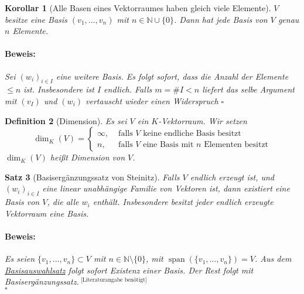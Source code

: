 \documentclass{report}
\newcommand{\IN}[1]{\index{#1|BH}}
\newcommand{\N}{\mathbb{N}}
\DeclareMathOperator{\Span}{span}
\theoremstyle{customrem}
\theoremstyle{customdef}
\newtheorem{definition}{Definition}[chapter]
\newtheorem{kor}[definition]{Korollar}
\newtheorem{satz}[definition]{Satz}
\renewenvironment{proof}{\vspace{-.75cm}\paragraph{Beweis: }}{\vspace{-.5cm}\hfill$\square$}
\begin{document}
	\begin{kor}[Alle Basen eines Vektorraumes haben gleich viele Elemente]
		$V$ besitze eine Basis $(v_1, \dots, v_n)$ mit $n \in \N \cup \{0\}$. Dann hat jede Basis von $V$ genau $n$ Elemente.\\
		
		\begin{proof}
			Sei $(w_i)_{i \in I}$ eine weitere Basis. Es folgt sofort, dass die Anzahl der Elemente $\le n$ ist. Insbesondere ist $I$ endlich. Falls $m = \#I < n$ liefert das selbe Argument mit $(v_I)$ und $(w_i)$ vertauscht wieder einen Widerspruch \Lightning
		\end{proof}
	\end{kor}
	\vspace{.25cm}
	\begin{definition}[Dimension]
		\IN{Vektorraum!Dimension}
		Es sei $V$ ein $K$-Vektorraum. Wir setzen
		$$\dim_K(V) = \begin{cases}\infty,&\text{ falls $V$ keine endliche Basis besitzt}\\n,&\text{ falls $V$ eine Basis mit $n$ Elementen besitzt}\end{cases}$$
		$\dim_K(V)$ heißt Dimension von $V$.
	\end{definition}
	
	\begin{satz}[Basisergänzungssatz von Steinitz]
		\label{satz218}
		Falls $V$ endlich erzeugt ist, und $(w_i)_{i \in I}$ eine linear unabhängige Familie von Vektoren ist, dann existiert eine Basis von $V$, die alle $w_i$ enthält. Insbesondere besitzt jeder endlich erzeugte Vektorraum eine Basis.\\
		
		\begin{proof}
			Es seien $\{v_1, \dots, v_n\} \subset V$ mit $n \in \N \setminus\{0\}$, mit $\Span(\{v_1, \dots, v_n\}) = V$. Aus dem \hyperref[satz213]{Basisauswahlsatz} folgt sofort Existenz einer Basis. Der Rest folgt mit Basisergänzungssatz.$^{\text{ [Literaturangabe benötigt]}}$\\
		\end{proof}
	\end{satz}
	
\end{document}
